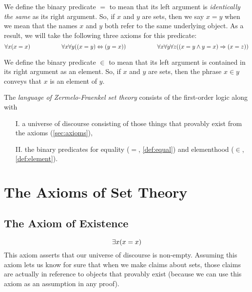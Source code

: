 \begin{definition}[Equality]\label{def:equal}
    We define the binary predicate \(=\) to mean that
    its left argument is \emph{identically the same} as its right argument.
    So, if \(x\) and \(y\) are sets, then we say \(x = y\)
    when we mean that the names \(x\) and \(y\) both refer to the same underlying object.
    As a result, we will take the following three axioms for this predicate:
    \vspace{-\parskip}
    \[
        \forall x \pn*{x = x}
        ~~~~~~~~~~~~~~~~
        \forall x \forall y \pn*{\pn*{x = y} \iff \pn*{y = x}}
        ~~~~~~~~~~~~~~~~
        \forall x \forall y \forall z \pn*{\pn*{x = y \meet y = x} \implies \pn*{x = z}}
    \]
    \vspace{-\parskip-\abovedisplayskip}
\end{definition}

\begin{definition}[Elementhood]\label{def:element}
    We define the binary predicate \(\in\) to mean that its left argument is
    contained in its right argument as an element.
    So, if \(x\) and \(y\) are sets, then the phrase \(x \in y\)
    conveys that \(x\) is an element of \(y\).
\end{definition}

\begin{definition}
    The \emph{language of Zermelo-Fraenkel set theory}
    consists of the first-order logic
    along with
    \begin{enumerate}
        \item[I.]
            a universe of discourse consisting of
            those things that provably exist from the axioms (\autoref{sec:axioms}),
        \item[II.]
            the binary predicates for equality (\(=\), \autoref{def:equal})
            and elementhood (\(\in\), \autoref{def:element}).
    \end{enumerate}
\end{definition}

\section{The Axioms of Set Theory}\label{sec:axioms}
\setcounter{preaxiom}{-1}

\subsection{The Axiom of Existence}
\begin{axiom}[Existence]\label{ax:existence}
    \vspace{-\abovedisplayskip}
    \[
        \exists x \pn*{x = x}
    \]
    This axiom asserts that our universe of discourse is non-empty.
    Assuming this axiom lets us know for sure that when we make claims about sets,
    those claims are actually in reference to objects that provably exist
    (because we can use this axiom as an assumption in any proof).
\end{axiom}

